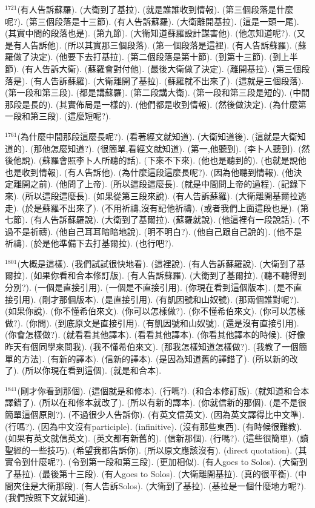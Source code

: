\documentclass{book}
\begin{document}
$^{1721}$(有人告訴蘇羅).
(大衛到了基拉).
(就是誰誰收到情報).
(第三個段落是什麼呢?).
(第三個段落是十三節).
(有人告訴蘇羅).
(大衛離開基拉).
(這是一頭一尾).
(其實中間的段落也是).
(第九節).
(大衛知道蘇羅設計謀害他).
(他怎知道呢?).
(又是有人告訴他).
(所以其實那三個段落).
(第一個段落是這裡).
(有人告訴蘇羅).
(蘇羅做了決定).
(他要下去打基拉).
(第二個段落是第十節).
(到第十三節).
(到上半節).
(有人告訴大衛).
(蘇羅會對付他).
(最後大衛做了決定).
(離開基拉).
(第三個段落是).
(有人告訴蘇羅).
(大衛離開了基拉).
(蘇羅就不出來了).
(這就是三個段落).
(第一段和第三段).
(都是講蘇羅).
(第二段講大衛).
(第一段和第三段是短的).
(中間那段是長的).
(其實佈局是一樣的).
(他們都是收到情報).
(然後做決定).
(為什麼第一段和第三段).
(這麼短呢?).

$^{1761}$(為什麼中間那段這麼長呢?).
(看著經文就知道).
(大衛知道後).
(這就是大衛知道的).
(那他怎麼知道?).
(很簡單,看經文就知道).
(第一,他聽到).
(李卜人聽到).
(然後他說).
(蘇羅會照李卜人所聽的話).
(下來不下來).
(他也是聽到的).
(也就是說他也是收到情報).
(有人告訴他).
(為什麼這段這麼長呢?).
(因為他聽到情報).
(他決定離開之前).
(他問了上帝).
(所以這段這麼長).
(就是中間問上帝的過程).
(記錄下來).
(所以這段這麼長).
(如果從第三段來說).
(有人告訴蘇羅).
(大衛離開基爾拉逃走).
(於是蘇羅不出來了).
(不用祈禱,沒有記他祈禱).
(或者我們上面這段也是).
(第七節).
(有人告訴蘇羅說).
(大衛到了基爾拉).
(蘇羅就說).
(他這裡有一段說話).
(不過不是祈禱).
(他自己耳耳暗暗地說).
(明不明白?).
(他自己跟自己說的).
(他不是祈禱).
(於是他準備下去打基爾拉).
(也行吧?).

$^{1801}$(大概是這樣).
(我們試試很快地看).
(這裡說).
(有人告訴蘇羅說).
(大衛到了基爾拉).
(如果你看和合本修訂版).
(有人告訴蘇羅).
(大衛到了基爾拉).
(聽不聽得到分別?).
(一個是直接引用).
(一個是不直接引用).
(你現在看到這個版本).
(是不直接引用).
(剛才那個版本).
(是直接引用).
(有凱因號和山奴號).
(那兩個誰對呢?).
(如果你說).
(你不懂希伯來文).
(你可以怎樣做?).
(你不懂希伯來文).
(你可以怎樣做?).
(你問).
(到底原文是直接引用).
(有凱因號和山奴號).
(還是沒有直接引用).
(你會怎樣做?).
(就看看其他譯本).
(看看其他譯本).
(你看其他譯本的時候).
(好像昨天有個同學來問我).
(我不懂希伯來文).
(那我怎樣知道怎樣做?).
(我教了一個簡單的方法).
(有新的譯本).
(信新的譯本).
(是因為知道舊的譯錯了).
(所以新的改了).
(所以你現在看到這個).
(就是和合本).

$^{1841}$(剛才你看到那個).
(這個就是和修本).
(行嗎?).
(和合本修訂版).
(就知道和合本譯錯了).
(所以在和修本就改了).
(所以有新的譯本).
(你就信新的那個).
(是不是很簡單這個原則?).
(不過很少人告訴你).
(有英文信英文).
(因為英文譯得比中文準).
(行嗎?).
(因為中文沒有participle).
(infinitive).
(沒有那些東西).
(有時候很難教).
(如果有英文就信英文).
(英文都有新舊的).
(信新那個).
(行嗎?).
(這些很簡單).
(讀聖經的一些技巧).
(希望我都告訴你).
(所以原文應該沒有).
(direct quotation).
(其實令到什麼呢?).
(令到第一段和第三段).
(更加相似).
(有人goes to Solos).
(大衛到了基拉).
(最後第十三段).
(有人goes to Solos).
(大衛離開基拉).
(真的很平衡).
(中間夾住是大衛那段).
(有人告訴Solos).
(大衛到了基拉).
(基拉是一個什麼地方呢?).
(我們按照下文就知道).
\end{document}

